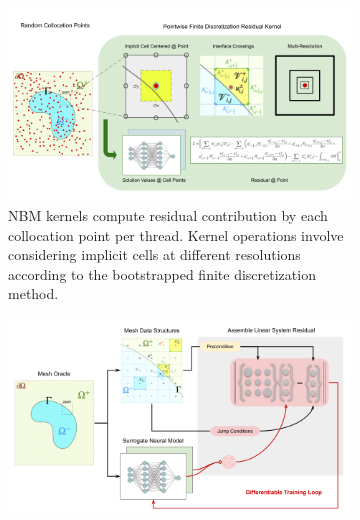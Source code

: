 \documentclass{elsarticle}
\begin{document}
\begin{figure}
     \centering
     \begin{subfigure}[b]{\textwidth}
         \centering
         \includegraphics[width=\textwidth]{./figures/jax_dips_paper_kernel.png}
         \caption{NBM kernels compute residual contribution by each collocation point per thread. Kernel operations involve considering implicit cells at different resolutions according to the bootstrapped finite discretization method.}
         \label{fig:nbm_kernel}
     \end{subfigure}
     \hfill
     \begin{subfigure}[b]{\textwidth}
         \centering
         \includegraphics[width=\textwidth]{./figures/jax_dips_paper_v1.png}

\end{subfigure}
\end{figure}
\end{document}
